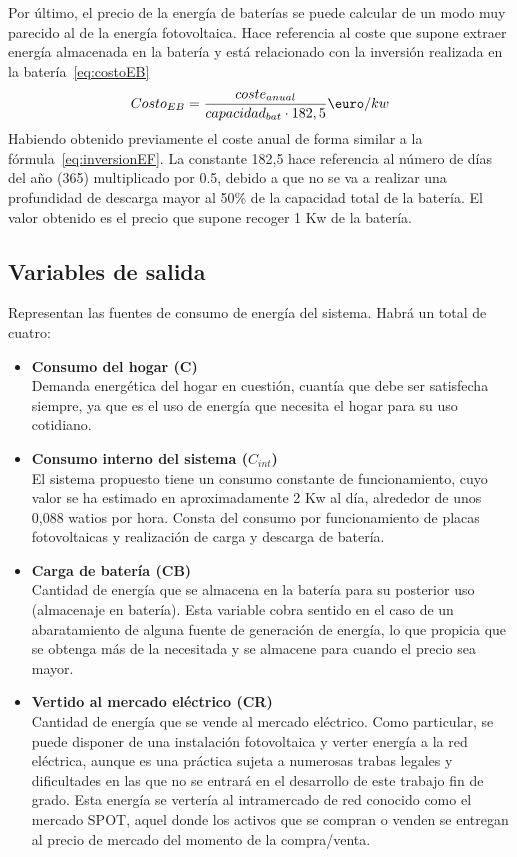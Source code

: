 	Por último, el precio de la energía de baterías se puede calcular de un modo muy parecido al de la energía fotovoltaica. Hace referencia al coste que supone extraer energía almacenada en la batería y está relacionado con la inversión realizada en la batería~\ref{eq:costoEB}
	\begin{equation}
          \label{eq:costoEB}
	Costo_{EB} = \frac{coste_{anual}}{capacidad_{bat}\cdot182,5} \textup{\euro}/kw
	\end{equation}
	Habiendo obtenido previamente el coste anual de forma similar a la fórmula~\ref{eq:inversionEF}. La constante 182,5 hace referencia al número de días del año (365) multiplicado por 0.5, debido a que no se va a realizar una profundidad de descarga mayor al 50\% de la capacidad total de la batería. El valor obtenido es el precio que supone recoger 1 Kw de la batería.
\subsection{Variables de salida}
Representan las fuentes de consumo de energía del sistema. Habrá un total de cuatro:
\begin{itemize}
	\item \textbf{Consumo del hogar (C)}\\Demanda energética del hogar en cuestión, cuantía que debe ser satisfecha siempre, ya que es el uso de energía que necesita el hogar para su uso cotidiano.
	\item \textbf{Consumo interno del sistema ($ C_{int} $)}\\El sistema propuesto tiene un consumo constante de funcionamiento, cuyo valor se ha estimado en aproximadamente 2 Kw al día, alrededor de unos 0,088 watios por hora. Consta del consumo por funcionamiento de placas fotovoltaicas y realización de carga y descarga de batería.
	\item \textbf{Carga de batería (CB)}\\Cantidad de energía que se almacena en la batería para su posterior uso (almacenaje en batería). Esta variable cobra sentido en el caso de un abaratamiento de alguna fuente de generación de energía, lo que propicia que se obtenga más de la necesitada y se almacene para cuando el precio sea mayor.
	\item \textbf{Vertido al mercado eléctrico (CR)}\\Cantidad de energía que se vende al mercado eléctrico. Como particular, se puede disponer de una instalación fotovoltaica y verter energía a la red eléctrica, aunque es una práctica sujeta a numerosas trabas legales y dificultades en las que no se entrará en el desarrollo de este trabajo fin de grado. Esta energía se vertería al intramercado de red conocido como el mercado SPOT, aquel donde los activos que se compran o venden se entregan al precio de mercado del momento de la compra/venta.
\end{itemize}

